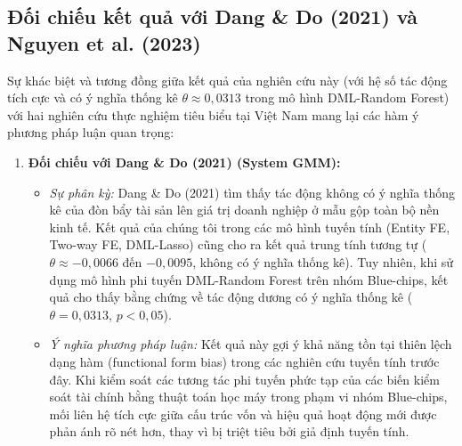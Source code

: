 \documentclass[12pt,a4paper]{article}
\begin{document}
\subsection{Đối chiếu kết quả với Dang \& Do (2021) và Nguyen et al. (2023)}
Sự khác biệt và tương đồng giữa kết quả của nghiên cứu này (với hệ số tác động tích cực và có ý nghĩa thống kê $\theta \approx 0,0313$ trong mô hình DML-Random Forest) với hai nghiên cứu thực nghiệm tiêu biểu tại Việt Nam mang lại các hàm ý phương pháp luận quan trọng:
\begin{enumerate}
    \item \textbf{Đối chiếu với Dang \& Do (2021) (System GMM):}
    \begin{itemize}
        \item \textit{Sự phân kỳ:} Dang \& Do (2021) tìm thấy tác động không có ý nghĩa thống kê của đòn bẩy tài sản lên giá trị doanh nghiệp ở mẫu gộp toàn bộ nền kinh tế. Kết quả của chúng tôi trong các mô hình tuyến tính (Entity FE, Two-way FE, DML-Lasso) cũng cho ra kết quả trung tính tương tự ($\theta \approx -0,0066$ đến $-0,0095$, không có ý nghĩa thống kê). Tuy nhiên, khi sử dụng mô hình phi tuyến DML-Random Forest trên nhóm Blue-chips, kết quả cho thấy bằng chứng về tác động dương có ý nghĩa thống kê ($\theta = 0,0313$, $p < 0,05$).
        \item \textit{Ý nghĩa phương pháp luận:} Kết quả này gợi ý khả năng tồn tại thiên lệch dạng hàm (functional form bias) trong các nghiên cứu tuyến tính trước đây. Khi kiểm soát các tương tác phi tuyến phức tạp của các biến kiểm soát tài chính bằng thuật toán học máy trong phạm vi nhóm Blue-chips, mối liên hệ tích cực giữa cấu trúc vốn và hiệu quả hoạt động mới được phản ánh rõ nét hơn, thay vì bị triệt tiêu bởi giả định tuyến tính.
    \end{itemize}
    

\end{enumerate}
\end{document}
